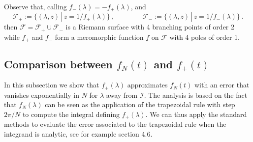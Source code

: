 \documentclass[11pt]{article}
\numberwithin{equation}{section}
\numberwithin{theorem}{section}
\newcommand{\matht}[1]{\texorpdfstring{#1}{}}
\begin{document}
Observe that, calling $f_-(\lambda)=-f_+(\lambda)$, and
\[
\mathcal
F_+:=\{(\lambda,z)\,|\, z=1/f_+(\lambda)\}\ ,\qquad\qquad \mathcal F_-:=
\{(\lambda,z)\,|\, z=1/f_-(\lambda)\}\ .
\]
then $\mathcal F=\mathcal F_+\cup \mathcal F_-$ is a Riemann surface with 4 branching points of order 2 while $f_+$ and
$f_-$ form a meromorphic function $f$ on $\mathcal F$ with 4 poles of order 1.


\subsection{Comparison between \matht{$f_N(t)$} and \matht{$f_+(t)$}}\label{subsec:fNf+}

In this subsection we show that $f_+(\lambda)$ approximates $f_N(t)$ with an error that vanishes exponentially in $N$ 
for $\lambda$ away from $\mathcal I$. The analysis is based on the fact that $f_N(\lambda)$ can be seen as the
application of the trapezoidal rule with step $2\pi/N$ to compute the integral defining $f_+(\lambda)$. We can thus 
apply the standard methods to evaluate the error associated to the trapezoidal rule when the integrand is analytic, see 
for example \cite{DR1984} section 4.6.
\end{document}
